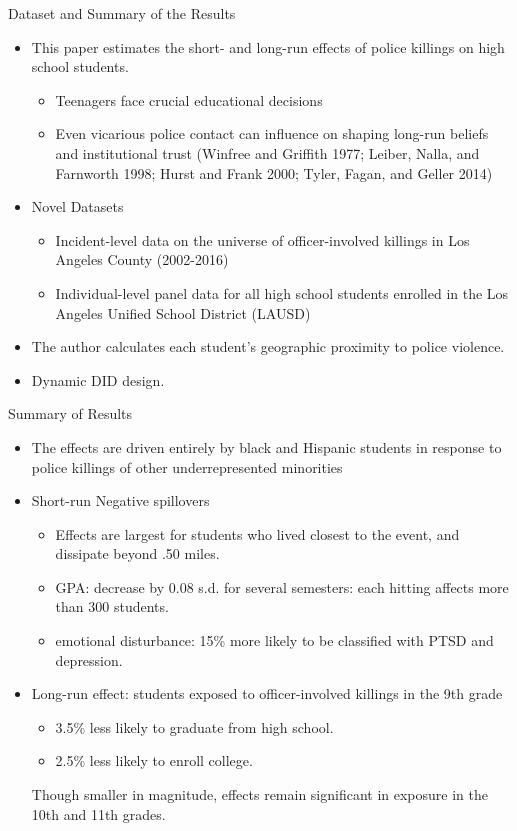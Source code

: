 \documentclass[dvipdfmx]{beamer}
\begin{document}
\begin{frame}{Dataset and Summary of the Results}
  \begin{itemize}
    \item This paper estimates the short- and long-run effects of police killings on high school students.
    \begin{itemize}
      \item Teenagers face crucial educational decisions
      \item Even vicarious police contact can influence on shaping long-run beliefs and institutional trust (Winfree and Griffith 1977; Leiber, Nalla, and
      Farnworth 1998; Hurst and Frank 2000; Tyler, Fagan, and Geller
      2014)
    \end{itemize}
    \item Novel Datasets
    \begin{itemize}
      \item Incident-level data on the universe
      of officer-involved killings in Los Angeles County (2002-2016)
      \item Individual-level panel data for all high school students enrolled in the Los Angeles Unified School District (LAUSD)
    \end{itemize}
    \item The author calculates each student's geographic proximity to police violence.
    \item Dynamic DID design.
  \end{itemize}
\end{frame}

\begin{frame}{Summary of Results}
  \begin{itemize}
    \item The effects are driven entirely by black and Hispanic students in response to police killings of other underrepresented minorities
    \item Short-run Negative spillovers
    \begin{itemize}
      \item Effects are largest for students who lived closest to the event, and dissipate beyond .50 miles.
      \item GPA: decrease by 0.08 s.d. for several semesters: each hitting affects more than 300 students.
      \item emotional disturbance: 15\% more likely to be classified with PTSD and depression.
    \end{itemize}
    \item Long-run effect: students exposed to officer-involved killings in the 9th grade 
    \begin{itemize}
      \item 3.5\% less likely to graduate from high school.
      \item 2.5\% less likely to enroll college.
    \end{itemize}
    Though smaller in magnitude, effects remain significant in exposure in the 10th and 11th grades.
  \end{itemize}
\end{frame}
\end{document}

